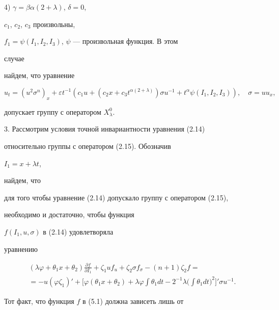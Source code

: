 4) $\gamma=\beta\alpha(2+\lambda)$, $\delta=0$,


$c_1$, $c_2$, $c_3$ произвольны,


$f_1=\psi(I_1,I_2,I_3)$, $\psi$ --- произвольная функция. В этом


случае


найдем, что уравнение


\begin{equation}


u_t=(u^2\sigma^n)_x+\varepsilon t^{-1}(c_1u+(c_2x+


c_3 t^{\alpha(2+\lambda)})\sigma u^{-1}+t^\alpha\psi


(I_1,I_2,I_3)),\quad \sigma=uu_x, \tag{4.33}


\end{equation}


допускает группу с оператором $X^0_\lambda$.


\medskip





3. Рассмотрим условия точной инвариантности уравнения (2.14)


относительно группы с оператором (2.15). Обозначив


$I_1=x+\lambda t$,


найдем, что


для того чтобы уравнение (2.14) допускало группу с оператором (2.15),


необходимо и достаточно, чтобы функция


$f(I_1,u,\sigma)$ в (2.14) удовлетворяла


уравнению


\begin{multline}


(\lambda\varphi+\theta_1x+\theta_2)


\frac{\partial f}{\partial I_1}+\zeta_1u f_u+


\zeta_2\sigma f_\sigma-(n+1)\zeta_2f=\\


=-u(\varphi\zeta_1)'+


\biggl[\varphi(\theta_1x+\theta_2)+\lambda\varphi\int \theta_1dt


-2^{-1}\lambda\biggl(\int \theta_1dt\biggr)^2\biggr]'\sigma u^{-1}.


\tag{5.1}


\end{multline}


Тот факт, что функция $f$ в (5.1) должна зависеть лишь от


